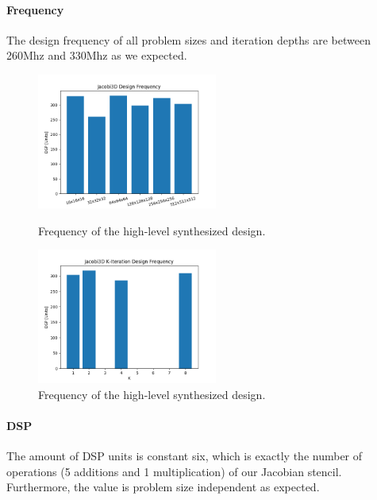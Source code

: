 \paragraph{Frequency}
The design frequency of all problem sizes and iteration depths are between 260Mhz and 330Mhz as we expected.

\begin{figure}[h]
	\begin{minipage}{.5\columnwidth}
		\centering
		\includegraphics[height=12em]{plots/jacobi3d_frequency.png}
		\caption{Frequency of the high-level synthesized design.}
		\label{fig:jacobi3d_frequency}
	\end{minipage}
	\begin{minipage}{.5\columnwidth}
		\centering
		\includegraphics[height=12em]{plots/jacobi3d_k_itr_frequency.png}
		\caption{Frequency of the high-level synthesized design.}
		\label{fig:jacobi3d_k_itr_frequency}
	\end{minipage}
\end{figure}



\paragraph{DSP}

The amount of DSP units is constant six, which  is exactly the number of operations (5 additions and 1 multiplication) of our Jacobian stencil. Furthermore, the value is problem size independent as expected.


